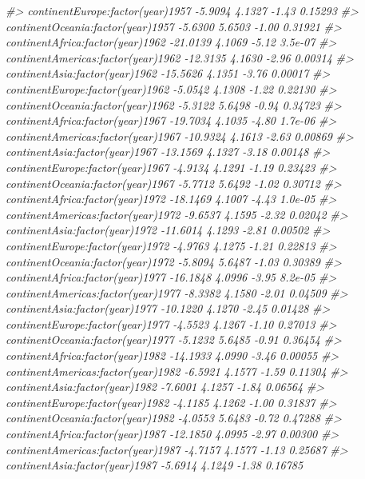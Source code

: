 \documentclass[]{book}
\newenvironment{Shaded}{\begin{snugshade}}{\end{snugshade}}
\newcommand{\CommentTok}[1]{\textcolor[rgb]{0.56,0.35,0.01}{\textit{#1}}}
\begin{document}
\begin{Shaded}
\begin{Highlighting}[]
\CommentTok{#> continentEurope:factor(year)1957    -5.9094     4.1327   -1.43  0.15293}
\CommentTok{#> continentOceania:factor(year)1957   -5.6300     5.6503   -1.00  0.31921}
\CommentTok{#> continentAfrica:factor(year)1962   -21.0139     4.1069   -5.12  3.5e-07}
\CommentTok{#> continentAmericas:factor(year)1962 -12.3135     4.1630   -2.96  0.00314}
\CommentTok{#> continentAsia:factor(year)1962     -15.5626     4.1351   -3.76  0.00017}
\CommentTok{#> continentEurope:factor(year)1962    -5.0542     4.1308   -1.22  0.22130}
\CommentTok{#> continentOceania:factor(year)1962   -5.3122     5.6498   -0.94  0.34723}
\CommentTok{#> continentAfrica:factor(year)1967   -19.7034     4.1035   -4.80  1.7e-06}
\CommentTok{#> continentAmericas:factor(year)1967 -10.9324     4.1613   -2.63  0.00869}
\CommentTok{#> continentAsia:factor(year)1967     -13.1569     4.1327   -3.18  0.00148}
\CommentTok{#> continentEurope:factor(year)1967    -4.9134     4.1291   -1.19  0.23423}
\CommentTok{#> continentOceania:factor(year)1967   -5.7712     5.6492   -1.02  0.30712}
\CommentTok{#> continentAfrica:factor(year)1972   -18.1469     4.1007   -4.43  1.0e-05}
\CommentTok{#> continentAmericas:factor(year)1972  -9.6537     4.1595   -2.32  0.02042}
\CommentTok{#> continentAsia:factor(year)1972     -11.6014     4.1293   -2.81  0.00502}
\CommentTok{#> continentEurope:factor(year)1972    -4.9763     4.1275   -1.21  0.22813}
\CommentTok{#> continentOceania:factor(year)1972   -5.8094     5.6487   -1.03  0.30389}
\CommentTok{#> continentAfrica:factor(year)1977   -16.1848     4.0996   -3.95  8.2e-05}
\CommentTok{#> continentAmericas:factor(year)1977  -8.3382     4.1580   -2.01  0.04509}
\CommentTok{#> continentAsia:factor(year)1977     -10.1220     4.1270   -2.45  0.01428}
\CommentTok{#> continentEurope:factor(year)1977    -4.5523     4.1267   -1.10  0.27013}
\CommentTok{#> continentOceania:factor(year)1977   -5.1232     5.6485   -0.91  0.36454}
\CommentTok{#> continentAfrica:factor(year)1982   -14.1933     4.0990   -3.46  0.00055}
\CommentTok{#> continentAmericas:factor(year)1982  -6.5921     4.1577   -1.59  0.11304}
\CommentTok{#> continentAsia:factor(year)1982      -7.6001     4.1257   -1.84  0.06564}
\CommentTok{#> continentEurope:factor(year)1982    -4.1185     4.1262   -1.00  0.31837}
\CommentTok{#> continentOceania:factor(year)1982   -4.0553     5.6483   -0.72  0.47288}
\CommentTok{#> continentAfrica:factor(year)1987   -12.1850     4.0995   -2.97  0.00300}
\CommentTok{#> continentAmericas:factor(year)1987  -4.7157     4.1577   -1.13  0.25687}
\CommentTok{#> continentAsia:factor(year)1987      -5.6914     4.1249   -1.38  0.16785}

\end{Highlighting}
\end{Shaded}
\end{document}
